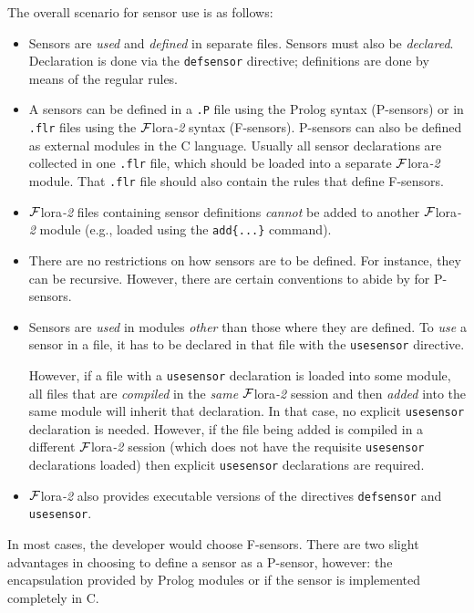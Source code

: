 \documentclass[11pt]{article}
\newcommand{\FLORA}{{\mbox{\sc ${\cal F}${lora}\rm\emph{-2}}}\xspace}
\newcommand{\FLSYSTEM}{\FLORA}
\newcommand{\flrext}{flr\xspace}
\begin{document}
The overall scenario for sensor use is as follows:
\begin{itemize}
\item  Sensors are \emph{used} and \emph{defined} in separate files.
  Sensors must also be \emph{declared}. 
  Declaration is done via the
  \texttt{defsensor} directive; definitions are done by means of the
  regular rules.
\item
  A sensors can be defined in a \texttt{.P} file
  using the Prolog syntax (P-sensors)  or in
  \texttt{.\flrext} files using the \FLSYSTEM syntax (F-sensors). 
  P-sensors can also be defined as external modules in the C language.
  Usually all sensor declarations are collected in one \texttt{.\flrext}
  file, which should be loaded into a separate \FLSYSTEM module. That
  \texttt{.\flrext} file 
  should also contain the rules that define F-sensors. 
\item 
  \FLSYSTEM files containing sensor definitions \emph{cannot} be added to
  another \FLSYSTEM module (e.g., loaded 
  using the \texttt{add\{...\}} command).
\item
  There are no restrictions on how sensors are to be defined. For instance,
  they can be recursive. However, there are certain conventions to abide by
  for P-sensors.
\item  Sensors are \emph{used} in modules \emph{other} than those where they
  are defined. To \emph{use} a sensor in a file, it has to be declared
  in that file with the \texttt{usesensor} directive.

  However, if a file with a \texttt{usesensor} declaration is loaded into
  some module, all
  files that are \emph{compiled} in the \emph{same} \FLSYSTEM session  
  and then \emph{added}  into the same module will inherit that declaration.
  In that case, no explicit \texttt{usesensor} declaration is needed.
  However, if the file being added is compiled in a different \FLSYSTEM
  session (which does not have the requisite \texttt{usesensor}
  declarations loaded) then explicit \texttt{usesensor} declarations are
  required.  
\item \FLSYSTEM also provides executable versions of the directives 
  \texttt{defsensor} and \texttt{usesensor}.  
\end{itemize}

In most cases, the developer would choose F-sensors. There are two slight
advantages in choosing to define a sensor as a P-sensor, however: the encapsulation
provided by Prolog modules or if the sensor is implemented completely in C.
\end{document}
